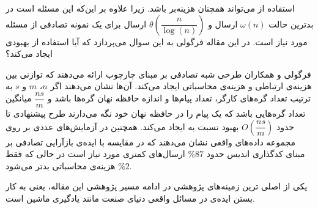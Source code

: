 \begin{enumerate}
استفاده از 
\icod
می‌تواند همچنان هزینه‌بر باشد. زیرا علاوه بر این‌که این مسئله
\nphard
است در بدترین حالت
$\omega(n)$
ارسال و 
$\theta(\dfrac{n}{\log(n)})$
ارسال برای یک نمونه تصادفی از مسئله مورد نیاز است. در این مقاله فرگولی به این سوال می‌پردازد که آیا استفاده از 
\picod
بهبودی ایجاد می‌کند؟

فرگولی و همکاران طرحی شبه تصادفی بر مبنای چارچوب
\picod
ارائه می‌دهند که توازنی بین هزینه‌ی ارتباطی و هزینه‌ی محاسباتی ایجاد می‌کند. آن‌ها نشان می‌دهند اگر
$n$، $m$ و $s$
به ترتیب تعداد گره‌های کارگر، تعداد پیام‌ها و اندازه حافظه نهان گره‌ها باشد و
$\dfrac{ns}{m}$
میانگین تعداد گره‌هایی باشد که یک پیام را در حافظه نهان خود نگه می‌دارند طرح پیشنهادی تا حدود
$O(\dfrac{ns}{m})$
بهبود نسبت به 
\icod
ایجاد می‌کند. همچنین در آزمایش‌های عددی بر روی مجموعه داده‌های واقعی نشان می‌دهند که در مقایسه با ایده‌‌ی بازآرایی تصادفی بر مبنای کدگذاری اندیس حدود
$\%87$
ارسال‌های کمتری مورد نیاز است در حالی که فقط
$\%2$
هزینه‌ی محاسباتی بدتر می‌شود.

یکی از اصلی ترین زمینه‌های پژوهشی در
\picod
ادامه مسیر پژوهشی این مقاله، یعنی به کار بستن ایده‌ی \picod در مسائل واقعی دنیای صنعت مانند یادگیری ماشین است.
	
\end{enumerate}